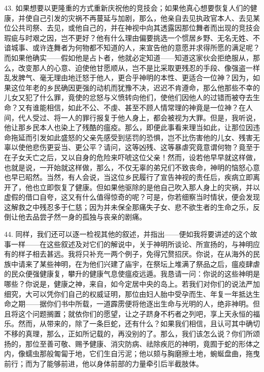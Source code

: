 43. 如果想要以更隆重的方式重新庆祝他的竞技会；如果他真心想要恢复人们的健康，并使自己引发的灾祸不再蔓延与加剧，那么，他亲自去见执政官本人、去见某位公共司祭、去见，或他自己的，并在神视中向其透露因那位舞者而出现的竞技会瑕疵与时艰之因，岂不更好？他有什么理由偏要挑选一个惯居乡野、无名无姓、不谙城事、或许连舞者为何物都不知道的人，来宣告他的意愿并求得所愿的满足呢？而如果他确实——假如他是占卜者，他就必定知道——知道这家伙会拒绝服从，那么，改变那人的心意、迫使他甘愿顺从，岂不是比采取更残忍的手段、像强盗一样乱发脾气、毫无理由地迁怒于他人，更合乎神明的本性、更适合一位神？因为，如果这位年老的乡民确因更强的动机而犹豫不决，迟迟不肯遵命，那么他那些不幸的儿女又犯了什么罪，竟使的忿怒与义愤转向他们，使他们因他人的过错而被夺去生命？又有谁能相信，如此不公、不虔、甚至不顾人情常理的神竟是一位神？在人间，代人受过、将一人的罪行报复于他人身上，都会被视为大罪。但是，我听说，他让那乡民本人也染上了残酷的瘟疫。那么，即便此事看来理当如此，让那位因违命拖延而引发如此盛怒的父亲先感受到惩罚的恐惧，岂不比伤害他的儿女、残害无辜以使他悲伤更妥当、更公平？请问，这等凶残、这等暴虐究竟意谓何物？竟至于在子女夭亡之后，又以自身的危险来吓唬这位父亲！然而，设若他早早就这样做，也就是说，一开始就这样做，那么，不仅无辜的弟兄们不致丧命，神明的恼怒心意也早已昭然。当然，有人会说，当这位乡民履行了宣告神视的责任后，疾病立即离开了，他也立即恢复了健康。但如果他驱除的是他自己吹入那人身上的灾祸，并以虚假的借口自夸，这又有什么值得惊奇的呢？可是，你若细察当时情状，便会发现这解救之中残忍多于仁慈；因为并未保全那痛失子女、悲不欲生者的生命之乐，反倒让他去品尝孑然一身的孤独与丧亲的剧痛。\par

44. 同样，我们还可以逐一检视其他的叙述，并指出——便如我将要讲述的这个故事一样——在这些叙述及对它们的解说中，关于神明所谈论、所宣扬的，与神明应有的样子相去甚远。我将只补充一两个例子，免得冗赘招厌。你说，在从海外的民族中请来了某些神明，在为他们兴建了庙宇，在祭坛上堆满了祭品之后，瘟疫肆虐的民众便强健康复，攀升的健康气息使瘟疫远遁。我恳请一问：你说的这些神明是哪些？你说是，健康之神，来自，如今定居中央的岛上。若我们对你们的说法严加细究，大可以凭你们自己的权威证明，那位由妇人胎中受孕而生、年复一年抵达生命之期——据你们书中所载，一道霹雳便将他逐出生命与光明的人，绝非神明。但且将这个问题搁置；就依你们的愿望，让之子跻身不朽者之列吧，享上天永恒的福乐。然而，从带来的，除了一条巨蛇，还有什么？如果我们相信，且认可其中确切不移的真理，那么，正如所记载的，再没别的了。那么，我们该怎么说？你们所颂扬的，那位至善可敬、赐予健康、消灾防病、祛除疾厄的神明，竟囿于蛇的形体之内，像蠕虫那般匍匐于地，它们生自污泥；他以颏与胸磨擦土地，蜿蜒盘曲，拖曳前行；而为了能够前进，他以身体前部的力量牵引后半截肢体。\par

